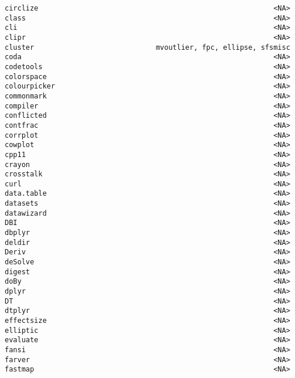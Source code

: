\documentclass[
  letterpaper,
  DIV=11,
  numbers=noendperiod]{scrreprt}
\begin{document}
\begin{verbatim}
circlize                                                        <NA>
class                                                           <NA>
cli                                                             <NA>
clipr                                                           <NA>
cluster                             mvoutlier, fpc, ellipse, sfsmisc
coda                                                            <NA>
codetools                                                       <NA>
colorspace                                                      <NA>
colourpicker                                                    <NA>
commonmark                                                      <NA>
compiler                                                        <NA>
conflicted                                                      <NA>
contfrac                                                        <NA>
corrplot                                                        <NA>
cowplot                                                         <NA>
cpp11                                                           <NA>
crayon                                                          <NA>
crosstalk                                                       <NA>
curl                                                            <NA>
data.table                                                      <NA>
datasets                                                        <NA>
datawizard                                                      <NA>
DBI                                                             <NA>
dbplyr                                                          <NA>
deldir                                                          <NA>
Deriv                                                           <NA>
deSolve                                                         <NA>
digest                                                          <NA>
doBy                                                            <NA>
dplyr                                                           <NA>
DT                                                              <NA>
dtplyr                                                          <NA>
effectsize                                                      <NA>
elliptic                                                        <NA>
evaluate                                                        <NA>
fansi                                                           <NA>
farver                                                          <NA>
fastmap                                                         <NA>

\end{verbatim}
\end{document}
